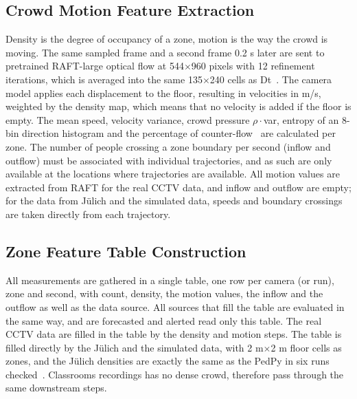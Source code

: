 \documentclass[conference]{IEEEtran}
\begin{document}
\subsection{Crowd Motion Feature Extraction}
Density is the degree of occupancy of a zone, motion is the way the crowd is moving. The same sampled frame and a second frame 0.2 s later are sent to pretrained RAFT-large optical flow at 544$\times$960 pixels with 12 refinement iterations, which is averaged into the same 135$\times$240 cells as Dt~\cite{teed2020raft}. The camera model applies each displacement to the floor, resulting in velocities in m/s, weighted by the density map, which means that no velocity is added if the floor is empty. The mean speed, velocity variance, crowd pressure $\rho\cdot$var, entropy of an 8-bin direction histogram and the percentage of counter-flow~\cite{helbing2007} are calculated per zone. The number of people crossing a zone boundary per second (inflow and outflow) must be associated with individual trajectories, and as such are only available at the locations where trajectories are available. All motion values are extracted from RAFT for the real CCTV data, and inflow and outflow are empty; for the data from J\"ulich and the simulated data, speeds and boundary crossings are taken directly from each trajectory.

\subsection{Zone Feature Table Construction}
All measurements are gathered in a single table, one row per camera (or run), zone and second, with count, density, the motion values, the inflow and the outflow as well as the data source. All sources that fill the table are evaluated in the same way, and are forecasted and alerted read only this table. The real CCTV data are filled in the table by the density and motion steps. The table is filled directly by the J\"ulich and the simulated data, with 2 m$\times$2 m floor cells as zones, and the J\"ulich densities are exactly the same as the PedPy in six runs checked~\cite{pedpy}. Classrooms recordings has no dense crowd, therefore pass through the same downstream steps.
\end{document}
